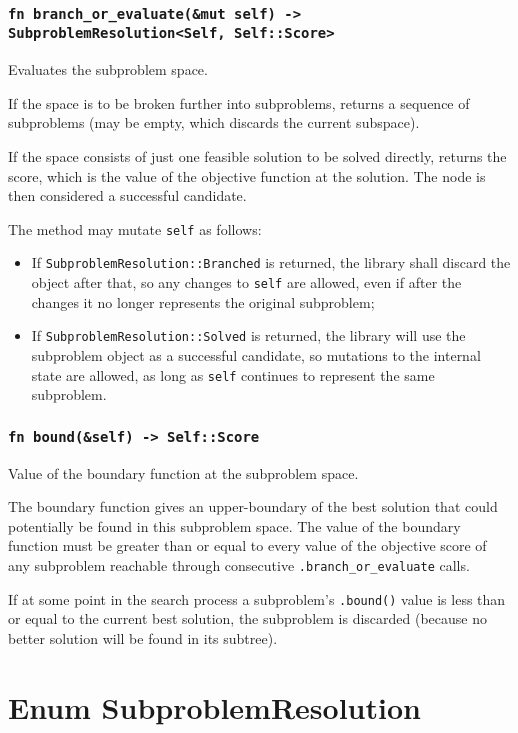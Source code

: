 \subsubsection*{\texttt{fn branch\_or\_evaluate(\&mut self) -> SubproblemResolution<Self, Self::Score>}}

Evaluates the subproblem space.

If the space is to be broken further into subproblems, returns a sequence of subproblems (may be empty, which discards the current subspace).

If the space consists of just one feasible solution to be solved directly, returns the score, which is the value of the objective function at the solution. The node is then considered a successful candidate.

The method may mutate \texttt{self} as follows:

\begin{itemize}
 \item If \texttt{SubproblemResolution::Branched} is returned, the library shall discard the object after that, so any changes to \texttt{self} are allowed, even if after the changes it no longer represents the original subproblem;
 \item If \texttt{SubproblemResolution::Solved} is returned, the library will use the subproblem object as a successful candidate, so mutations to the internal state are allowed, as long as \texttt{self} continues to represent the same subproblem.
\end{itemize}

\subsubsection*{\texttt{fn bound(\&self) -> Self::Score}}

Value of the boundary function at the subproblem space.

The boundary function gives an upper-boundary of the best solution that could potentially be found in this subproblem space. The value of the boundary function must be greater than or equal to every value of the objective score of any subproblem reachable through consecutive \texttt{.branch\_or\_evaluate} calls.


If at some point in the search process a subproblem’s \texttt{.bound()} value is less than or equal to the current best solution, the subproblem is discarded (because no better solution will be found in its subtree).

\section*{Enum SubproblemResolution}

